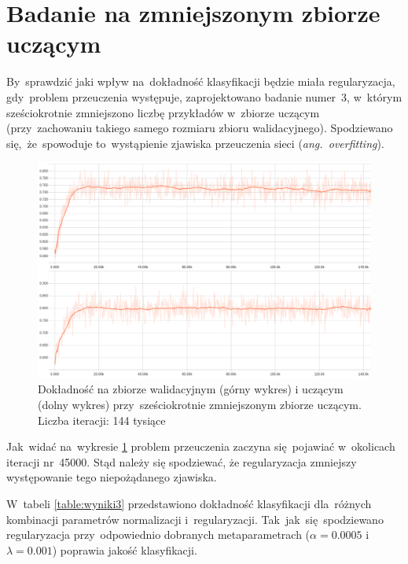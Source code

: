 \section{Badanie na zmniejszonym zbiorze uczącym}
By~sprawdzić jaki wpływ na~dokładność klasyfikacji będzie miała regularyzacja, gdy~problem przeuczenia występuje,
zaprojektowano badanie numer~3, w~którym sześciokrotnie zmniejszono liczbę przykładów w~zbiorze uczącym (przy~zachowaniu
takiego samego rozmiaru zbioru walidacyjnego). Spodziewano się,~że~spowoduje to~wystąpienie zjawiska przeuczenia sieci
(\textit{ang.~overfitting}).

\begin{figure}[H]
	\centering
	\includegraphics[width=\linewidth]{img/badanie_3.png}
	\caption{Dokładność na zbiorze walidacyjnym (górny wykres) i uczącym (dolny wykres) przy~sześciokrotnie
	         zmniejszonym zbiorze uczącym. Liczba iteracji: 144 tysiące}
	\label{rys:badanie-3}
\end{figure}

Jak~widać na~wykresie \ref{rys:badanie-3} problem przeuczenia zaczyna się~pojawiać w~okolicach iteracji nr~45000.
Stąd należy się spodziewać, że regularyzacja zmniejszy występowanie tego niepożądanego zjawiska.

W~tabeli \ref{table:wyniki3} przedstawiono dokładność klasyfikacji dla~różnych kombinacji parametrów normalizacji
i~regularyzacji. Tak~jak~się~spodziewano regularyzacja przy~odpowiednio dobranych metaparametrach
($\alpha=0.0005$ i~$\lambda=0.001$) poprawia jakość klasyfikacji.

